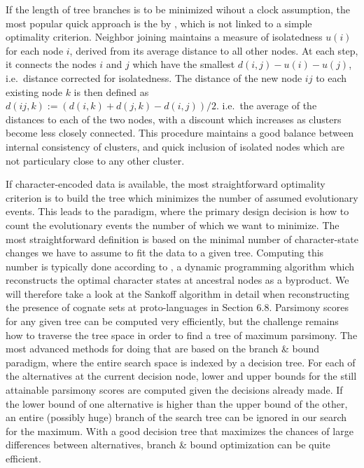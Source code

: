 If the length of tree branches is to be minimized wihout a clock assumption, the most popular quick approach is the  by \citet{saitou_nei_1987}, which is not linked to a simple optimality criterion. Neighbor joining maintains a measure of isolatedness $u(i)$ for each node $i$, derived from its average distance to all other nodes. At each step, it connects the nodes $i$ and $j$ which have the smallest $d(i,j) - u(i) - u(j)$, i.e.\ distance corrected for isolatedness. The distance of the new node $ij$ to each existing node $k$ is then defined as $d(ij,k) := (d(i,k) + d(j,k) - d(i,j))/2$. i.e.\ the average of the distances to each of the two nodes, with a discount which increases as clusters become less closely connected. This procedure maintains a good balance between internal consistency of clusters, and quick inclusion of isolated nodes which are not particulary close to any other cluster.

If character-encoded data is available, the most straightforward optimality criterion is to build the tree which minimizes the number of assumed evolutionary events. This leads to the \textit{} paradigm, where the primary design decision is how to count the evolutionary events the number of which we want to minimize. The most straightforward definition is based on the minimal number of character-state changes we have to assume to fit the data to a given tree. Computing this number is typically done according to \citet{sankoff1975}, a dynamic programming algorithm which reconstructs the optimal character states at ancestral nodes as a byproduct. We will therefore take a look at the Sankoff algorithm in detail when reconstructing the presence of cognate sets at proto-languages in Section 6.8. Parsimony scores for any given tree can be computed very efficiently, but the challenge remains how to traverse the tree space in order to find a tree of maximum parsimony. The most advanced methods 
for doing that are based on the branch \& bound paradigm, where the entire search space is indexed by a decision tree. For each of the alternatives at the current decision node, lower and upper bounds for the still attainable parsimony scores are computed given the decisions already made. If the lower bound of one alternative is higher than the upper bound of the other, an entire (possibly huge) branch of the search tree can be ignored in our search for the maximum. With a good decision tree that maximizes the chances of large differences between alternatives, branch \& bound optimization can be quite efficient.

